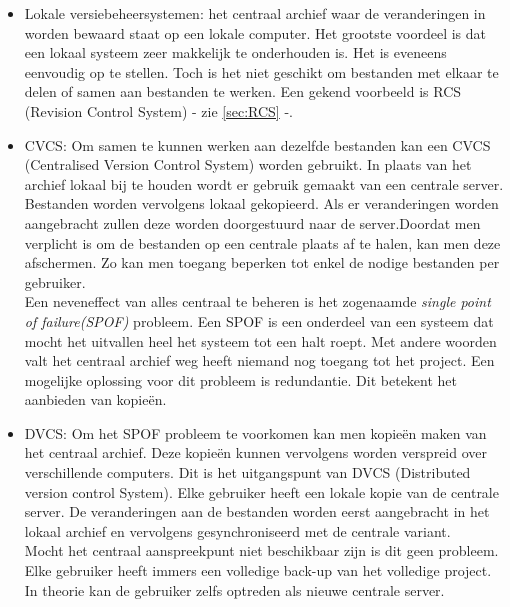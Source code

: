 \begin{itemize}
	\item Lokale versiebeheersystemen: het centraal archief waar de veranderingen in worden bewaard staat op een lokale computer. Het grootste voordeel is dat een lokaal systeem zeer makkelijk te onderhouden is. Het is eveneens eenvoudig op te stellen. Toch is het niet geschikt om bestanden met elkaar te  delen of samen aan bestanden te werken. Een gekend voorbeeld is RCS (Revision Control System) - zie \ref{sec:RCS} -. \\
	
	\item CVCS: Om samen te kunnen werken aan dezelfde bestanden kan een CVCS (Centralised Version Control System) worden gebruikt. In plaats van het archief lokaal bij te houden wordt er gebruik gemaakt van een centrale server. Bestanden worden vervolgens lokaal gekopieerd. Als er veranderingen worden aangebracht zullen deze worden doorgestuurd naar de server.Doordat men verplicht is om de bestanden op een centrale plaats af te halen, kan men deze afschermen. Zo kan men toegang beperken tot enkel de nodige bestanden per gebruiker. \\
	
Een neveneffect van alles centraal te beheren is het zogenaamde \textit{single point of failure(SPOF)} probleem. Een SPOF is een onderdeel van een systeem dat mocht het uitvallen heel het systeem tot een halt roept. Met andere woorden valt het centraal archief weg heeft niemand nog toegang tot het project. Een mogelijke oplossing voor dit probleem is redundantie. Dit betekent het aanbieden van kopieën. \autocite{Sun2007}\\

	\item DVCS: Om het SPOF probleem te voorkomen kan men kopieën maken van het centraal archief. Deze kopieën kunnen vervolgens worden verspreid over verschillende computers. Dit is het uitgangspunt van DVCS (Distributed version control System). Elke gebruiker heeft een lokale kopie van de centrale server. De veranderingen aan de bestanden worden eerst aangebracht in het lokaal archief en vervolgens gesynchroniseerd met de centrale variant.\\

Mocht het centraal aanspreekpunt niet beschikbaar zijn is dit geen probleem. Elke gebruiker heeft immers een volledige back-up van het volledige project. In theorie kan de gebruiker zelfs optreden als nieuwe centrale server.
\end{itemize}



